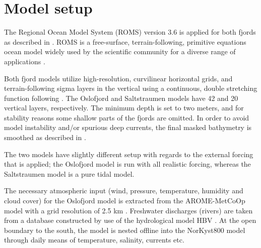 \section{Model setup}

The Regional Ocean Model System (ROMS) version 3.6 is applied for both fjords as described in \cite{roed16}. ROMS is a free-surface, terrain-following, primitive equations ocean model widely used by the scientific community for a diverse range of applications \cite[]{shchepetkin05,shchepetkin09,haidvogel08}. 

Both fjord models utilize high-resolution, curvilinear horizontal grids, and terrain-following sigma layers in the vertical using a continuous, double stretching function following \cite{shchepetkin09}. The Oslofjord and Saltstraumen models have 42 and 20 vertical layers, respectively. The minimum depth is set to two meters, and for stability reasons some shallow parts of the fjords are omitted. In order to avoid model instability and/or spurious deep currents, the final masked bathymetry is smoothed as described in \cite{roed16}.



The two models have slightly different setup with regards to the external forcing that is applied; the Oslofjord model is run with all realistic forcing, whereas the Saltstraumen model is a pure tidal model. 

The necessary atmospheric input (wind, pressure, temperature, humidity and cloud cover) for the Oslofjord model is extracted from the AROME-MetCoOp model with a grid resolution of 2.5 km \cite[]{muller2015}. Freshwater discharges (rivers) are taken from a database constructed by use of the hydrological model HBV \cite[]{beldring2003}. At the open boundary to the south, the model is nested offline into the NorKyst800 model \cite[]{albretsen11} through daily means of temperature, salinity, currents etc.

